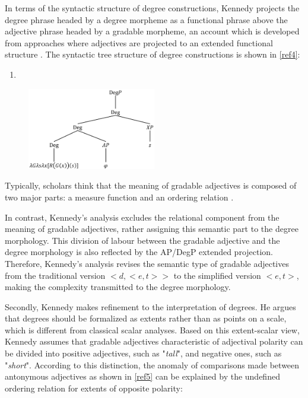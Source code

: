 \documentclass{ctexart}
\let \cite \parencite
\begin{document}
In terms of the syntactic structure of degree constructions, Kennedy projects the degree phrase headed by a degree morpheme as a functional phrase above the adjective phrase headed by a gradable morpheme, an account which is developed from approaches where adjectives are projected to an extended functional structure \cite{abney1987,corver1990,corver1997b,grimshaw1991}. The syntactic tree structure of degree constructions is shown in \ref{ref4}:

\begin{enumerate}[resume]
\item \label{ref4}
\end{enumerate}

\begin{figure}[h]
\centering
\includegraphics[width=0.5\textwidth]{pic/pic1.png}
\end{figure}

Typically, scholars think that the meaning of gradable adjectives is composed of two major parts: a measure function and an ordering relation \cite{carston2013,horn1992}.

In contrast, Kennedy’s analysis excludes the relational component from the meaning of gradable adjectives, rather assigning this semantic part to the degree morphology. This division of labour between the gradable adjective and the degree morphology is also reflected by the AP/DegP extended projection. Therefore, Kennedy’s analysis revises the semantic type of gradable adjectives from the traditional version $<d,<e,t>>$ to the simplified version $<e,t>$, making the complexity transmitted to the degree morphology.

Secondly, Kennedy makes refinement to the interpretation of degrees. He argues that degrees should be formalized as extents\cite{seuren1978,von1984b,bierwisch1989,lobner2010} rather than as points on a scale, which is different from classical scalar analyses. Based on this extent-scalar view, Kennedy assumes that gradable adjectives characteristic of adjectival polarity can be divided into positive adjectives, such as "\textit{tall}", and negative ones, such as "\textit{short}". According to this distinction, the anomaly of comparisons made between antonymous adjectives as shown in \ref{ref5} can be explained by the undefined ordering relation for extents of opposite polarity:
\end{document}
